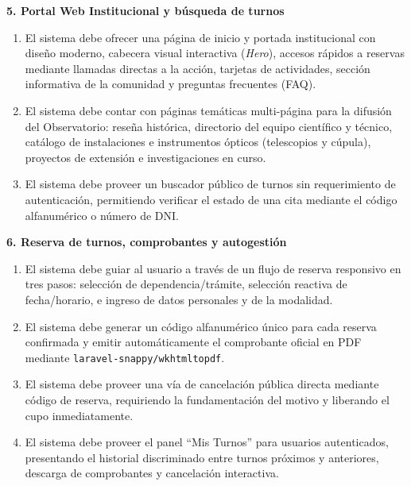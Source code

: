 \textbf{5. Portal Web Institucional y búsqueda de turnos}
\begin{enumerate}[resume]
    \item El sistema debe ofrecer una página de inicio y portada institucional con diseño moderno, cabecera visual interactiva (\textit{Hero}), accesos rápidos a reservas mediante llamadas directas a la acción, tarjetas de actividades, sección informativa de la comunidad y preguntas frecuentes (FAQ).
    \item El sistema debe contar con páginas temáticas multi-página para la difusión del Observatorio: reseña histórica, directorio del equipo científico y técnico, catálogo de instalaciones e instrumentos ópticos (telescopios y cúpula), proyectos de extensión e investigaciones en curso.
    \item El sistema debe proveer un buscador público de turnos sin requerimiento de autenticación, permitiendo verificar el estado de una cita mediante el código alfanumérico o número de DNI.
\end{enumerate}

\textbf{6. Reserva de turnos, comprobantes y autogestión}
\begin{enumerate}[resume]
    \item El sistema debe guiar al usuario a través de un flujo de reserva responsivo en tres pasos: selección de dependencia/trámite, selección reactiva de fecha/horario, e ingreso de datos personales y de la modalidad.
    \item El sistema debe generar un código alfanumérico único para cada reserva confirmada y emitir automáticamente el comprobante oficial en PDF mediante \texttt{laravel-snappy/wkhtmltopdf}.
    \item El sistema debe proveer una vía de cancelación pública directa mediante código de reserva, requiriendo la fundamentación del motivo y liberando el cupo inmediatamente.
    \item El sistema debe proveer el panel ``Mis Turnos'' para usuarios autenticados, presentando el historial discriminado entre turnos próximos y anteriores, descarga de comprobantes y cancelación interactiva.
\end{enumerate}

